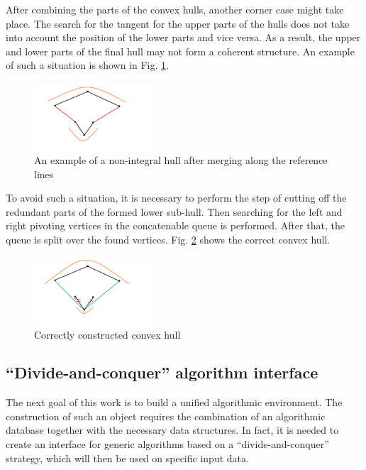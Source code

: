 \documentclass[twoside,twocolumn,10pt]{article}
\begin{document}
	After combining the parts of the convex hulls, another corner case might take place. The search for the tangent for the upper parts of the hulls does not take into account the position of the lower parts and vice versa. As a result, the upper and lower parts of the final hull may not form a coherent structure. An example of such a situation is shown in Fig. \ref{fig:incorect_lower_subhull}.
	
	\begin{figure}[t]
		\centering
		\includegraphics[width=0.4\textwidth, height=0.2\textheight]{incorect_lower_subhull}
		\caption{An example of a non-integral hull after merging along the reference lines}
		\label{fig:incorect_lower_subhull}
	\end{figure}
	
	To avoid such a situation, it is necessary to perform the step of cutting off the redundant parts of the formed lower sub-hull. Then searching for the left and right pivoting vertices in the concatenable queue is performed. After that, the queue is split over the found vertices. Fig. \ref{fig:correct_convex_hull} shows the correct convex hull.
	
	\begin{figure}[t]
		\centering
		\includegraphics[width=0.4\textwidth, height=0.2\textheight]{correct_convex_hull}
		\caption{Correctly constructed convex hull}
		\label{fig:correct_convex_hull}
	\end{figure}

\subsection{``Divide-and-conquer'' algorithm interface}

	The next goal of this work is to build a unified algorithmic environment. The construction of such an object requires the combination of an algorithmic database together with the necessary data structures.  In fact, it is needed to create an interface for generic algorithms based on a ``divide-and-conquer'' strategy, which will then be used on specific input data.
	
\end{document}
